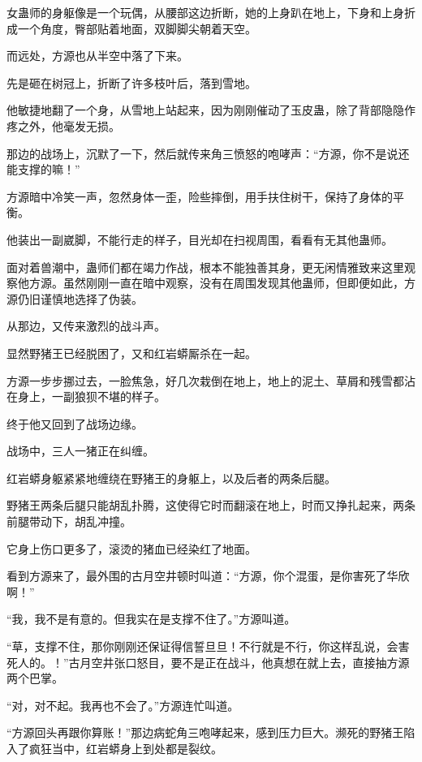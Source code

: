 
\begin{this_body}



女蛊师的身躯像是一个玩偶，从腰部这边折断，她的上身趴在地上，下身和上身折成一个角度，臀部贴着地面，双脚脚尖朝着天空。

而远处，方源也从半空中落了下来。

先是砸在树冠上，折断了许多枝叶后，落到雪地。

他敏捷地翻了一个身，从雪地上站起来，因为刚刚催动了玉皮蛊，除了背部隐隐作疼之外，他毫发无损。

那边的战场上，沉默了一下，然后就传来角三愤怒的咆哮声：“方源，你不是说还能支撑的嘛！”

方源暗中冷笑一声，忽然身体一歪，险些摔倒，用手扶住树干，保持了身体的平衡。

他装出一副崴脚，不能行走的样子，目光却在扫视周围，看看有无其他蛊师。

面对着兽潮中，蛊师们都在竭力作战，根本不能独善其身，更无闲情雅致来这里观察他方源。虽然刚刚一直在暗中观察，没有在周围发现其他蛊师，但即便如此，方源仍旧谨慎地选择了伪装。

从那边，又传来激烈的战斗声。

显然野猪王已经脱困了，又和红岩蟒厮杀在一起。

方源一步步挪过去，一脸焦急，好几次栽倒在地上，地上的泥土、草屑和残雪都沾在身上，一副狼狈不堪的样子。

终于他又回到了战场边缘。

战场中，三人一猪正在纠缠。

红岩蟒身躯紧紧地缠绕在野猪王的身躯上，以及后者的两条后腿。

野猪王两条后腿只能胡乱扑腾，这使得它时而翻滚在地上，时而又挣扎起来，两条前腿带动下，胡乱冲撞。

它身上伤口更多了，滚烫的猪血已经染红了地面。

看到方源来了，最外围的古月空井顿时叫道：“方源，你个混蛋，是你害死了华欣啊！”

“我，我不是有意的。但我实在是支撑不住了。”方源叫道。

“草，支撑不住，那你刚刚还保证得信誓旦旦！不行就是不行，你这样乱说，会害死人的。！”古月空井张口怒目，要不是正在战斗，他真想在就上去，直接抽方源两个巴掌。

“对，对不起。我再也不会了。”方源连忙叫道。

“方源回头再跟你算账！”那边病蛇角三咆哮起来，感到压力巨大。濒死的野猪王陷入了疯狂当中，红岩蟒身上到处都是裂纹。


\end{this_body}
